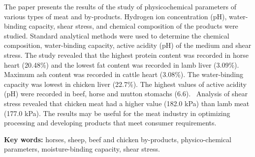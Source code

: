 The paper presents the results of the study of physicochemical
parameters of various types of meat and by-products. Hydrogen ion
concentration (pH), water-binding capacity, shear stress, and chemical
composition of the products were studied. Standard analytical methods
were used to determine the chemical composition, water-binding capacity,
active acidity (pH) of the medium and shear stress. The study revealed
that the highest protein content was recorded in horse heart (20.48\%)
and the lowest fat content was recorded in lamb liver (3.09\%). Maximum
ash content was recorded in cattle heart (3.08\%). The water-binding
capacity was lowest in chicken liver (22.7\%). The highest values of
active acidity (pH) were recorded in beef, horse and mutton stomachs
(6.6). ~Analysis of shear stress revealed that chicken meat had a higher
value (182.0 kPa) than lamb meat (177.0 kPa). The results may be useful
for the meat industry in optimizing processing and developing products
that meet consumer requirements.

{\bfseries Key words:} horses, sheep, beef and chicken by-products,
physico-chemical parameters, moisture-binding capacity, shear stress.

